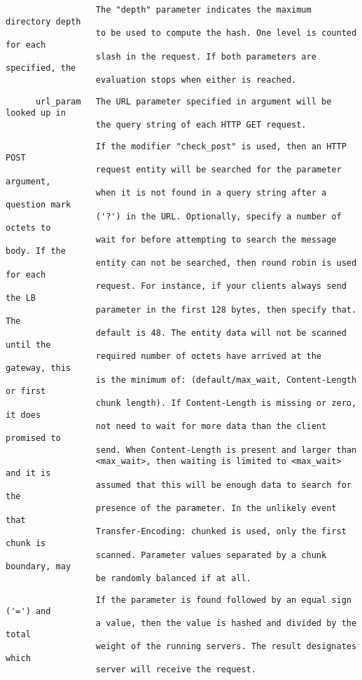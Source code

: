 \begin{verbatim}
                  The "depth" parameter indicates the maximum directory depth
                  to be used to compute the hash. One level is counted for each
                  slash in the request. If both parameters are specified, the
                  evaluation stops when either is reached.
\end{verbatim}

\begin{verbatim}
      url_param   The URL parameter specified in argument will be looked up in
                  the query string of each HTTP GET request.
\end{verbatim}

\begin{verbatim}
                  If the modifier "check_post" is used, then an HTTP POST
                  request entity will be searched for the parameter argument,
                  when it is not found in a query string after a question mark
                  ('?') in the URL. Optionally, specify a number of octets to
                  wait for before attempting to search the message body. If the
                  entity can not be searched, then round robin is used for each
                  request. For instance, if your clients always send the LB
                  parameter in the first 128 bytes, then specify that. The
                  default is 48. The entity data will not be scanned until the
                  required number of octets have arrived at the gateway, this
                  is the minimum of: (default/max_wait, Content-Length or first
                  chunk length). If Content-Length is missing or zero, it does
                  not need to wait for more data than the client promised to
                  send. When Content-Length is present and larger than
                  <max_wait>, then waiting is limited to <max_wait> and it is
                  assumed that this will be enough data to search for the
                  presence of the parameter. In the unlikely event that
                  Transfer-Encoding: chunked is used, only the first chunk is
                  scanned. Parameter values separated by a chunk boundary, may
                  be randomly balanced if at all.
\end{verbatim}

\begin{verbatim}
                  If the parameter is found followed by an equal sign ('=') and
                  a value, then the value is hashed and divided by the total
                  weight of the running servers. The result designates which
                  server will receive the request.
\end{verbatim}

